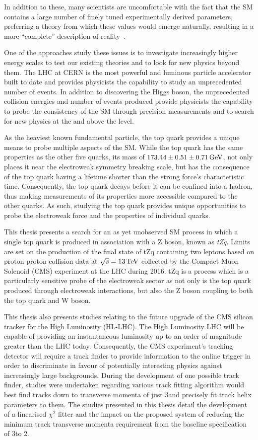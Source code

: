 In addition to these, many scientists are uncomfortable with the fact that the SM contains a large number of finely tuned experimentally derived parameters, preferring a theory from which these values would emerge naturally, resulting in a more ``complete'' description of reality~\cite{Burdman:2007ck}.

One of the approaches study these issues is to investigate increasingly higher energy scales to test our existing theories and to look for new physics beyond them.
The LHC at CERN is the most powerful and luminous particle accelerator built to date and provides physicists the capability to study an unprecedented number of events.
In addition to discovering the Higgs boson, the unprecedented collision energies and number of events produced provide physicists the capability to probe the consistency of the SM through precision measurements and to search for new physics at the and above the \TeV level.

As the heaviest known fundamental particle, the top quark provides a unique means to probe multiple aspects of the SM.
While the top quark has the same properties as the other five quarks, its mass of $173.44 \pm 0.51 \pm 0.71 \,\text{Ge\hspace{-.08em}V}$, not only places it near the electroweak symmetry breaking scale, but has the consequence of the top quark having a lifetime shorter than the strong force’s characteristic time.
Consequently, the top quark decays before it can be confined into a hadron, thus making measurements of its properties more accessible compared to the other quarks.
As such, studying the top quark provides unique opportunities to probe the electroweak force and the properties of individual quarks.

This thesis presents a search for an as yet unobserved SM process in which a single top quark is produced  in association with a Z boson, known as \emph{tZq}.
Limits are set on the production of the final state of tZq containing two leptons based on proton-proton collision data at $\sqrt{s} = 13\,\text{Te\hspace{-.08em}V}$ collected by the Compact Muon Solenoid (CMS) experiment at the LHC during 2016.
tZq is a process which is a particularly sensitive probe of the electroweak sector as not only is the top quark produced through electroweak interactions, but also the Z boson coupling to both the top quark and W boson.

This thesis also presents studies relating to the future upgrade of the CMS silicon tracker for the High Luminosity (HL-LHC).
The High Luminosity LHC will be capable of providing an instantaneous luminosity up to an order of magnitude greater than the LHC today.
Consequently, the CMS experiment's tracking detector will require a track finder to provide information to the online trigger in order to discriminate in favour of potentially interesting physics against increasingly large backgrounds.
During the development of one possible track finder, studies were undertaken regarding various track fitting algorithm would best find tracks down to transverse momenta of just 3\GeV and precisely fit track helix parameters to them.
The studies presented in this thesis detail the development of a linearised $\chi^{2}$ fitter and the impact on the proposed system of reducing the minimum track transverse momenta requirement from the baseline specification of 3\GeV to 2\GeV.
